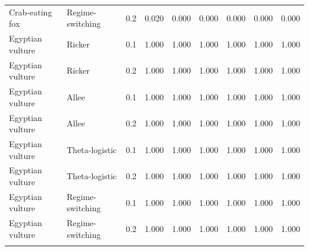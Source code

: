 \documentclass[10pt]{article}
\begin{document}
\begin{landscape}
\begin{center}
\begin{longtable}{@{}llc*{6}{r}@{}}
Crab-eating fox & Regime-switching & 0.2 & 0.020 & 0.000 & 0.000 & 0.000 & 0.000 & 0.000 \\
\addlinespace[2pt]
Egyptian vulture & Ricker & 0.1 & 1.000 & 1.000 & 1.000 & 1.000 & 1.000 & 1.000 \\
Egyptian vulture & Ricker & 0.2 & 1.000 & 1.000 & 1.000 & 1.000 & 1.000 & 1.000 \\
Egyptian vulture & Allee & 0.1 & 1.000 & 1.000 & 1.000 & 1.000 & 1.000 & 1.000 \\
Egyptian vulture & Allee & 0.2 & 1.000 & 1.000 & 1.000 & 1.000 & 1.000 & 1.000 \\
Egyptian vulture & Theta-logistic & 0.1 & 1.000 & 1.000 & 1.000 & 1.000 & 1.000 & 1.000 \\
Egyptian vulture & Theta-logistic & 0.2 & 1.000 & 1.000 & 1.000 & 1.000 & 1.000 & 1.000 \\
Egyptian vulture & Regime-switching & 0.1 & 1.000 & 1.000 & 1.000 & 1.000 & 1.000 & 1.000 \\
Egyptian vulture & Regime-switching & 0.2 & 1.000 & 1.000 & 1.000 & 1.000 & 1.000 & 1.000 \\
\addlinespace[2pt]
\end{longtable}
\end{center}
\end{landscape}
\end{document}
